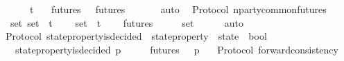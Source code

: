 \begin{isabellebody}
\ \ {\isasymlongrightarrow}\ {\isacharparenleft}{\isasymsigma}{}\ {\isasymunion}\ {\isasymsigma}{}{\isacharparenright}\ {\isasymin}\ {\isasymSigma}t\isanewline
\ \ {\isasymlongrightarrow}\ futures\ {\isasymsigma}{}\ {\isasyminter}\ futures\ {\isasymsigma}{}\ {\isasymnoteq}\ {\isasymemptyset}{\isachardoublequoteclose}\isanewline
%
\isadelimproof
\ \ %
\endisadelimproof
%
\isatagproof
{}\isamarkupfalse%
\ auto%
\endisatagproof
{\isafoldproof}%
%
\isadelimproof
\isanewline
%
\endisadelimproof
\isanewline
\isanewline
{}\isamarkupfalse%
\ {\isacharparenleft}\ Protocol{\isacharparenright}\ n{\isacharunderscore}party{\isacharunderscore}common{\isacharunderscore}futures\ {\isacharcolon}\isanewline
\ \ {\isachardoublequoteopen}{\isasymforall}\ {\isasymsigma}{\isacharunderscore}set{\isachardot}\ {\isasymsigma}{\isacharunderscore}set\ {\isasymsubseteq}\ {\isasymSigma}t\isanewline
\ \ {\isasymlongrightarrow}\ {\isasymUnion}\ {\isasymsigma}{\isacharunderscore}set\ {\isasymin}\ {\isasymSigma}t\isanewline
\ \ {\isasymlongrightarrow}\ {\isasymInter}\ {\isacharbraceleft}futures\ {\isasymsigma}\ {\isacharbar}\ {\isasymsigma}{\isachardot}\ {\isasymsigma}\ {\isasymin}\ {\isasymsigma}{\isacharunderscore}set{\isacharbraceright}\ {\isasymnoteq}\ {\isasymemptyset}{\isachardoublequoteclose}\isanewline
%
\isadelimproof
\ \ %
\endisadelimproof
%
\isatagproof
{}\isamarkupfalse%
\ auto%
\endisatagproof
{\isafoldproof}%
%
\isadelimproof
\isanewline
%
\endisadelimproof
\isanewline
\isanewline
\isanewline
\isanewline
\isanewline
{}\isamarkupfalse%
\ {\isacharparenleft}\ Protocol{\isacharparenright}\ state{\isacharunderscore}property{\isacharunderscore}is{\isacharunderscore}decided\ {\isacharcolon}{\isacharcolon}\ {\isachardoublequoteopen}{\isacharparenleft}state{\isacharunderscore}property\ {\isacharasterisk}\ state{\isacharparenright}\ {\isasymRightarrow}\ bool{\isachardoublequoteclose}\isanewline
\ \ \isanewline
\ \ \ \ {\isachardoublequoteopen}state{\isacharunderscore}property{\isacharunderscore}is{\isacharunderscore}decided\ {\isacharparenleft}p{\isacharcomma}\ {\isasymsigma}{\isacharparenright}\ {\isacharequal}\ {\isacharparenleft}{\isasymforall}\ {\isasymsigma}{\isacharprime}\ {\isasymin}\ futures\ {\isasymsigma}\ {\isachardot}\ p\ {\isasymsigma}{\isacharprime}{\isacharparenright}{\isachardoublequoteclose}\isanewline
\isanewline
\isanewline
{}\isamarkupfalse%
\ {\isacharparenleft}\ Protocol{\isacharparenright}\ forward{\isacharunderscore}consistency\ {\isacharcolon}\isanewline

\end{isabellebody}
